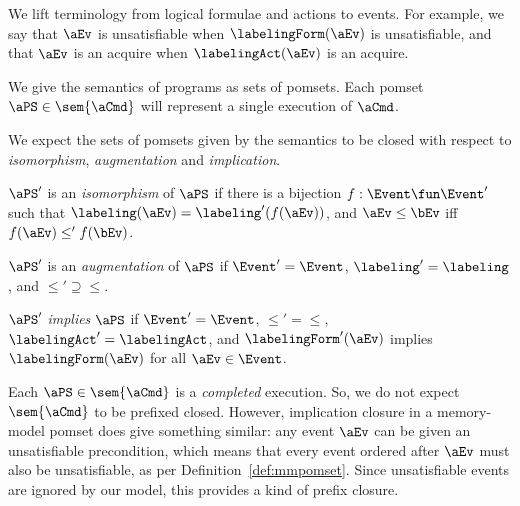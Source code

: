 We lift terminology from logical formulae and actions to events. For example,
we say that $\aEv$ is unsatisfiable when $\labelingForm(\aEv)$ is unsatisfiable,
and that $\aEv$ is an acquire when $\labelingAct(\aEv)$ is an acquire.


We give the semantics of programs as sets of pomsets.  Each pomset
$\aPS\in\sem{\aCmd}$ will represent a single execution of $\aCmd$.

We expect the sets of pomsets given by the semantics to be closed with
respect to \emph{isomorphism}, \emph{augmentation} and \emph{implication}.
\begin{definition}
  $\aPS'$ is an \emph{isomorphism} of $\aPS$ if there is a bijection
  $f:\Event\fun\Event'$ such that $\labeling(\aEv)=\labeling'(f(\aEv))$, and
  $\aEv\le\bEv$ iff $f(\aEv)\le'f(\bEv)$. %

  $\aPS'$ is an \emph{augmentation} of $\aPS$ if $\Event'=\Event$,
  ${\labeling'}={\labeling}$, and ${\le'}\supseteq{\le}$. %

  $\aPS'$ \emph{implies} $\aPS$ if $\Event'=\Event$, ${\le'}={\le}$,
  $\labelingAct'=\labelingAct$, and $\labelingForm'(\aEv)$
  implies $\labelingForm(\aEv)$ for all $\aEv\in\Event$.
\end{definition}
Each
$\aPS\in\sem{\aCmd}$ is a \emph{completed} execution.  So, we do not expect $\sem{\aCmd}$ to be prefixed closed.  However, implication
closure in a memory-model pomset does give something similar: any event
$\aEv$ can be given an unsatisfiable precondition, which means that every
event ordered after $\aEv$ must also be unsatisfiable, as per
Definition~\ref{def:mmpomset}.  Since unsatisfiable events are ignored by our model, this
provides a kind of prefix closure.

